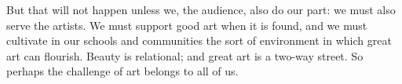 \documentclass[letterpaper]{article}
\begin{document}
But that will not happen unless we, the audience, also do our part: we
must also serve the artists. We must support good art when it is
found, and we must cultivate in our schools and communities the sort
of environment in which great art can flourish. Beauty is relational;
and great art is a two-way street. So perhaps the challenge of art
belongs to all of us.
\end{document}
